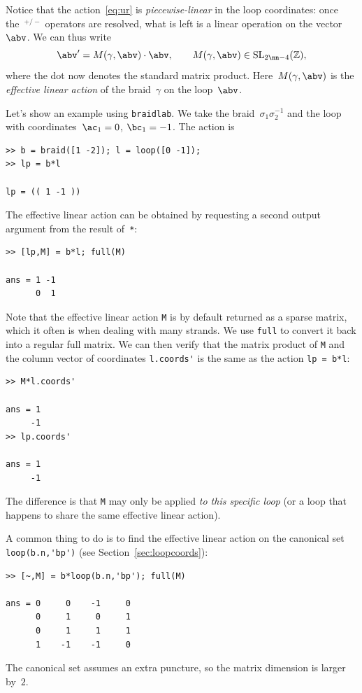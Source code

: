 \documentclass[12pt]{article}
\newcommand{\braidlab}{\texttt{braidlab}}%
\newcommand{\braid}{\texttt{braid}}%
\newcommand{\loopc}{\texttt{loop}}%
\begin{document}
Notice that the action~\eqref{eq:ur} is \emph{piecewise-linear} in the loop
coordinates: once the~${}^{+/-}$ operators are resolved, what is left is a
linear operation on the vector~$\abv$.  We can thus write
\begin{equation}
  \abv' = M(\gamma,\abv)\cdot\abv,
  \qquad
  M(\gamma,\abv) \in \mathrm{SL}_{2\nn-4}(\mathbb{Z}),
\end{equation}
where the dot now denotes the standard matrix product.  Here~$M(\gamma,\abv)$
is the \emph{effective linear action} of the braid~$\gamma$ on the
loop~$\abv$.

\index{braid class@\braid\ class!action on \loopc\ (\lstinline{*})|(}%
Let's show an example using \braidlab.  We take the
braid~$\sigma_1\sigma_2^{-1}$ and the loop with coordinates~$\ac_1=0$,
$\bc_1=-1$.  The action is
\begin{lstlisting}[frame=single,framerule=0pt]
>> b = braid([1 -2]); l = loop([0 -1]);
>> lp = b*l

lp = (( 1 -1 ))
\end{lstlisting}
The effective linear action can be obtained by requesting a second output
argument from the result of~\lstinline{*}:
\begin{lstlisting}[frame=single,framerule=0pt]
>> [lp,M] = b*l; full(M)

ans = 1 -1
      0  1
\end{lstlisting}
Note that the effective linear action \lstinline{M} is by default returned as
a sparse matrix, %
%
which it often is when dealing with many strands.  We use \lstinline{full} %
%
to convert it back into a regular full matrix.  We can then verify that the
matrix product of \lstinline{M} and the column vector of coordinates
\lstinline{l.coords'} is the same as the action \lstinline{lp = b*l}:
\begin{lstlisting}[frame=single,framerule=0pt]
>> M*l.coords'

ans = 1
     -1
>> lp.coords'

ans = 1
     -1
\end{lstlisting}
The difference is that \lstinline{M} may only be applied \emph{to this
  specific loop} (or a loop that happens to share the same effective linear
action).

A common thing to do is to find the effective linear action on the canonical
set \lstinline{loop(b.n,'bp')} (see Section~\ref{sec:loopcoords}):
\begin{lstlisting}[frame=single,framerule=0pt]
>> [~,M] = b*loop(b.n,'bp'); full(M)

ans = 0     0    -1     0
      0     1     0     1
      0     1     1     1
      1    -1    -1     0
\end{lstlisting}
The canonical set assumes an extra puncture, so the matrix dimension is larger
by~$2$.
\end{document}
